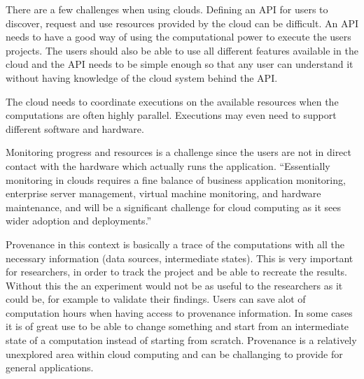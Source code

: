 
There are a few challenges when using clouds. Defining an API for
users to discover, request and use resources provided by the cloud can
be difficult. An API needs to have a good way of using the
computational power to execute the users projects. The users should
also be able to use all different features available in the cloud and
the API needs to be simple enough so that any user can understand it
without having knowledge of the cloud system behind the API.

The cloud needs to coordinate executions on the available resources
when the computations are often highly parallel. Executions may even
need to support different software and hardware.



Monitoring progress and resources is a challenge since the users are
not in direct contact with the hardware which actually runs the
application. ``Essentially monitoring in clouds requires a fine
balance of business application monitoring, enterprise server
management, virtual machine monitoring, and hardware maintenance, and
will be a significant challenge for cloud computing as it sees wider
adoption and deployments.''\citep{foster:2008}



Provenance in this context is basically a trace of the computations
with all the necessary information (data sources, intermediate
states). This is very important for researchers, in order to track the
project and be able to recreate the results. Without this the an
experiment would not be as useful to the researchers as it could be,
for example to validate their findings. Users can save alot of
computation hours when having access to provenance information. In
some cases it is of great use to be able to change something and start
from an intermediate state of a computation instead of starting from
scratch. Provenance is a relatively unexplored area within cloud
computing and can be challanging to provide for general applications.

